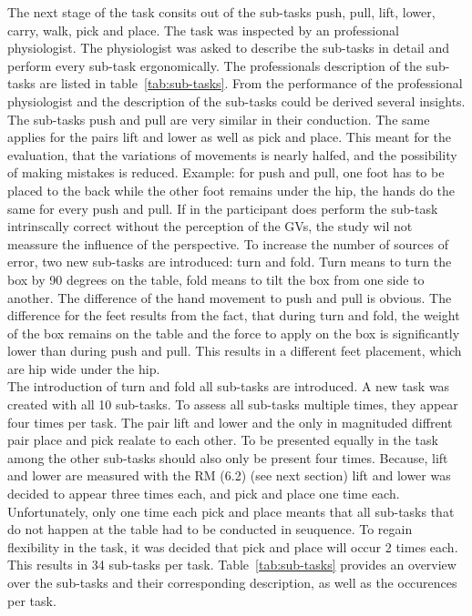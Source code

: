 The next stage of the task consits out of the sub-tasks push, pull, lift, lower, carry, walk, pick and place. The task was inspected by an professional physiologist. The physiologist was asked to describe the sub-tasks in detail and perform every sub-task ergonomically. The professionals description of the sub-tasks are listed in table~\ref{tab:sub-tasks}. From the performance of the professional physiologist and the description of the sub-tasks could be derived several insights. The sub-tasks push and pull are very similar in their conduction. The same applies for the pairs lift and lower as well as pick and place. This meant for the evaluation, that the variations of movements is nearly halfed, and the possibility of making mistakes is reduced. Example: for push and pull, one foot has to be placed to the back while the other foot remains under the hip, the hands do the same for every push and pull. If in the participant does perform the sub-task intrinscally correct without the perception of the GVs, the study wil not meassure the influence of the perspective. To increase the number of sources of error, two new sub-tasks are introduced: turn and fold. Turn means to turn the box by 90 degrees on the table, fold means to tilt the box from one side to another. The difference of the hand movement to push and pull is obvious. The difference for the feet results from the fact, that during turn and fold, the weight of the box remains on the table and the force to apply on the box is significantly lower than during push and pull. This results in a different feet placement, which are hip wide under the hip.\\
The introduction of turn and fold all sub-tasks are introduced. A new task was created with all 10 sub-tasks. To assess all sub-tasks multiple times, they appear four times per task. The pair lift and lower and the only in magnituded diffrent pair place and pick realate to each other. To be presented equally in the task among the other sub-tasks should also only be present four times. Because, lift and lower are measured with the RM (6.2) (see next section) lift and lower was decided to appear three times each, and pick and place one time each. Unfortunately, only one time each pick and place meants that all sub-tasks that do not happen at the table had to be conducted in seuquence. To regain flexibility in the task, it was decided that pick and place will occur 2 times each. This results in 34 sub-tasks per task. Table~\ref{tab:sub-tasks} provides an overview over the sub-tasks and their corresponding description, as well as the occurences per task.

